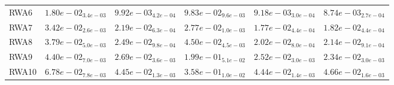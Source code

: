 \documentclass{article}
\begin{document}
\begin{table}
\begin{scriptsize}
\begin{tabular}{llllll}
RWA6 & $  1.80e-02_{ 3.4e-03}$ & $  9.92e-03_{ 4.2e-04}$ & $  9.83e-02_{ 9.6e-03}$ & \cellcolor{gray25}$  9.18e-03_{ 3.0e-04}$ & \cellcolor{gray95}$  8.74e-03_{ 2.7e-04}$ \\
RWA7 & $  3.42e-02_{ 2.6e-03}$ & $  2.19e-02_{ 6.3e-04}$ & $  2.77e-02_{ 1.0e-03}$ & \cellcolor{gray95}$  1.77e-02_{ 4.4e-04}$ & \cellcolor{gray25}$  1.82e-02_{ 4.4e-04}$ \\
RWA8 & $  3.79e-02_{ 5.0e-03}$ & $  2.49e-02_{ 9.8e-04}$ & $  4.50e-02_{ 4.5e-03}$ & \cellcolor{gray95}$  2.02e-02_{ 8.0e-04}$ & \cellcolor{gray25}$  2.14e-02_{ 9.1e-04}$ \\
RWA9 & $  4.40e-02_{ 7.0e-03}$ & $  2.69e-02_{ 3.6e-03}$ & $  1.99e-01_{ 5.1e-02}$ & \cellcolor{gray25}$  2.52e-02_{ 3.0e-03}$ & \cellcolor{gray95}$  2.34e-02_{ 3.0e-03}$ \\
RWA10 & $  6.78e-02_{ 7.8e-03}$ & \cellcolor{gray25}$  4.45e-02_{ 1.3e-03}$ & $  3.58e-01_{ 1.0e-02}$ & \cellcolor{gray95}$  4.44e-02_{ 1.4e-03}$ & $  4.66e-02_{ 1.6e-03}$ \\
\hline
\end{tabular}
\end{scriptsize}
\end{table}
\end{document}
